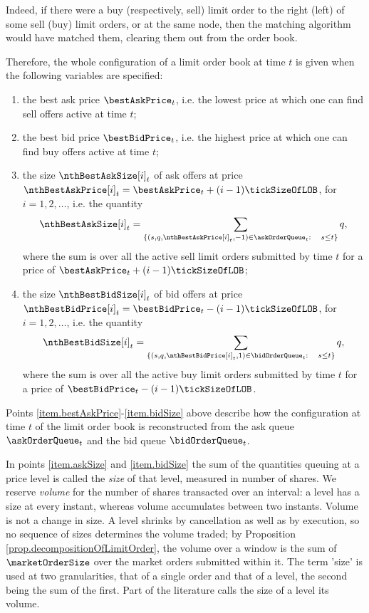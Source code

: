 Indeed,
if there were a buy (respectively, sell) limit order to the right (left) of some sell (buy) limit orders,
or at the same node,
then the matching algorithm would have matched them, clearing them out from the order book.

Therefore, the whole configuration of a limit order book at time $t$ is given
when the following variables are specified:
\begin{enumerate}[label={\emph{\roman{*}}.}, ref={\emph{\roman{*}}.}]
\item\label{item.bestAskPrice} the best ask price $\bestAskPrice_{t}$, i.e.
the lowest price at which one can find sell offers active at time $t$;
\item\label{item.bestBidPrice} the best bid price $\bestBidPrice_t$, i.e.
the highest price at which one can find buy offers active at time $t$;
\item\label{item.askSize} the size $\nthBestAskSize[i]_t$ of ask offers at price
$\nthBestAskPrice[i]_t= \bestAskPrice_t + (i-1)\tickSizeOfLOB$, for $i=1,2,\dots$, i.e.
the quantity
\begin{equation*}
 \nthBestAskSize[i]_t = \sum_{\lbrace(s,q,\nthBestAskPrice[i]_t,-1) \in \askOrderQueue_t : \quad s\leq t\rbrace} q,
\end{equation*}
where the sum is over all the active sell limit orders submitted by time $t$
for a price of $\bestAskPrice_t + (i-1)\tickSizeOfLOB$;
\item\label{item.bidSize} the size $\nthBestBidSize[i]_t$ of bid offers at price
$\nthBestBidPrice[i]_t=\bestBidPrice_t - (i-1)\tickSizeOfLOB$, for $i=1,2,\dots$, i.e.
the quantity
\begin{equation*}
 \nthBestBidSize[i]_t = \sum_{\lbrace (s,q,\nthBestBidPrice[i]_t,1) \in \bidOrderQueue_t: \quad s\leq t\rbrace} q,
\end{equation*}
where the sum is over all the active buy limit orders submitted by time $t$
for a price of $\bestBidPrice_t - (i-1)\tickSizeOfLOB$.
\end{enumerate}
Points \ref{item.bestAskPrice}-\ref{item.bidSize} above describe how the configuration at time $t$
of the limit order book is reconstructed from the ask queue $\askOrderQueue_t$
and the bid queue $\bidOrderQueue_t$.

\begin{remark}
\label{remark.sizeVersusVolume}
In points \ref{item.askSize} and \ref{item.bidSize} the sum of the quantities queuing at a
price level is called the \emph{size} of that level,
measured in number of shares.
We reserve \emph{volume} for the number of shares transacted over an interval:
a level has a size at every instant, whereas volume accumulates between two instants.
Volume is not a change in size.
A level shrinks by cancellation as well as by execution,
so no sequence of sizes determines the volume traded;
by Proposition \ref{prop.decompositionOfLimitOrder},
the volume over a window is the sum of $\marketOrderSize$
over the market orders submitted within it.
The term 'size' is used at two granularities,
that of a single order and that of a level,
the second being the sum of the first.
Part of the literature calls the size of a level its volume.
\end{remark}

